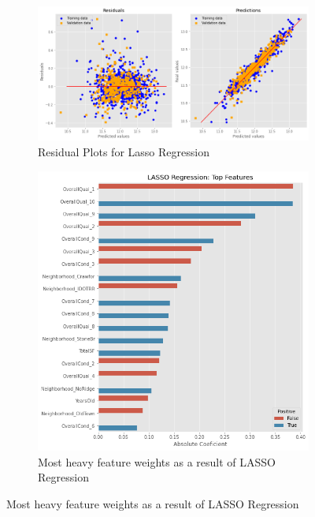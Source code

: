 \documentclass{article}
\begin{document}
	\begin{figure}[h!]
		\centering
		\begin{subfigure}[b]{0.4\linewidth}
		  \includegraphics[width=\linewidth]{lassoplot}
		  \caption{Residual Plots for Lasso Regression}
		\end{subfigure}
		\begin{subfigure}[b]{0.4\linewidth}
		  \includegraphics[width=\linewidth]{lassofeat}
		  \caption{Most heavy feature weights as a result of LASSO Regression}
		\end{subfigure}
		\label{fig:correlation}
	  \end{figure}
	  
\end{document}
